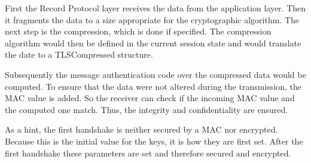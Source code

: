 First the Record Protocol layer receives the data from the application layer. Then it fragments the data to a size appropriate for the cryptographic algorithm. 
The next step is the compression, which is done if specified. The compression algorithm would then be defined in the current session state and would translate the date to a TLSCompressed structure.
 
Subsequently the message authentication code over the compressed data would be computed.
To ensure that the data were not altered during the transmission, the MAC value is added. So the receiver can check if the incoming MAC value and the computed one 
match. Thus, the integrity and confidentiality are ensured.

As a hint, the first handshake is neither secured by a MAC nor encrypted. Because this is the initial value for the keys, it is how they are first set. After the first handshake these parameters are set and therefore secured and encrypted.
\cite{ms:Record}